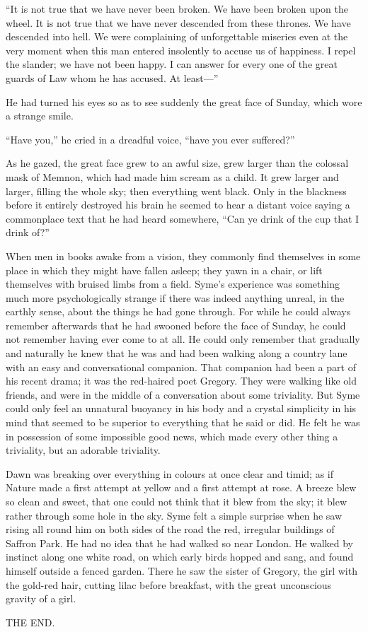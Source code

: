 \documentclass{book}
\begin{document}
“It is not true that we have never been broken. We have been broken upon the wheel. It is not true that we have never descended from these thrones. We have descended into hell. We were complaining of unforgettable miseries even at the very moment when this man entered insolently to accuse us of happiness. I repel the slander; we have not been happy. I can answer for every one of the great guards of Law whom he has accused. At least—”

He had turned his eyes so as to see suddenly the great face of Sunday, which wore a strange smile.

“Have you,” he cried in a dreadful voice, “have you ever suffered?”

As he gazed, the great face grew to an awful size, grew larger than the colossal mask of Memnon, which had made him scream as a child. It grew larger and larger, filling the whole sky; then everything went black. Only in the blackness before it entirely destroyed his brain he seemed to hear a distant voice saying a commonplace text that he had heard somewhere, “Can ye drink of the cup that I drink of?”

When men in books awake from a vision, they commonly find themselves in some place in which they might have fallen asleep; they yawn in a chair, or lift themselves with bruised limbs from a field. Syme’s experience was something much more psychologically strange if there was indeed anything unreal, in the earthly sense, about the things he had gone through. For while he could always remember afterwards that he had swooned before the face of Sunday, he could not remember having ever come to at all. He could only remember that gradually and naturally he knew that he was and had been walking along a country lane with an easy and conversational companion. That companion had been a part of his recent drama; it was the red-haired poet Gregory. They were walking like old friends, and were in the middle of a conversation about some triviality. But Syme could only feel an unnatural buoyancy in his body and a crystal simplicity in his mind that seemed to be superior to everything that he said or did. He felt he was in possession of some impossible good news, which made every other thing a triviality, but an adorable triviality.

Dawn was breaking over everything in colours at once clear and timid; as if Nature made a first attempt at yellow and a first attempt at rose. A breeze blew so clean and sweet, that one could not think that it blew from the sky; it blew rather through some hole in the sky. Syme felt a simple surprise when he saw rising all round him on both sides of the road the red, irregular buildings of Saffron Park. He had no idea that he had walked so near London. He walked by instinct along one white road, on which early birds hopped and sang, and found himself outside a fenced garden. There he saw the sister of Gregory, the girl with the gold-red hair, cutting lilac before breakfast, with the great unconscious gravity of a girl.

THE END.
\end{document}
